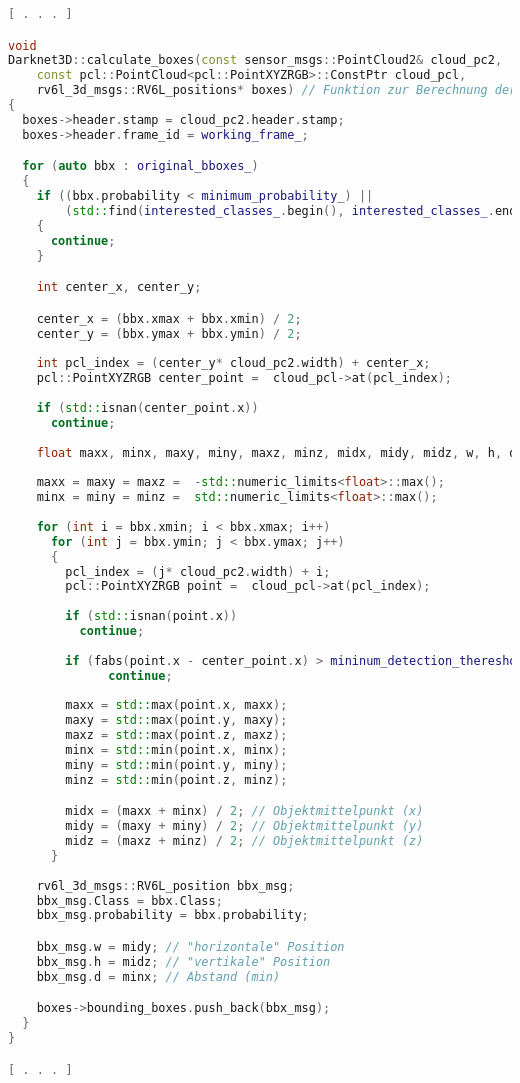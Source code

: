 \begin{lstlisting}[language=c++]
[ . . . ]

void
Darknet3D::calculate_boxes(const sensor_msgs::PointCloud2& cloud_pc2,
    const pcl::PointCloud<pcl::PointXYZRGB>::ConstPtr cloud_pcl,
    rv6l_3d_msgs::RV6L_positions* boxes) // Funktion zur Berechnung der Positionsdaten
{
  boxes->header.stamp = cloud_pc2.header.stamp;
  boxes->header.frame_id = working_frame_;

  for (auto bbx : original_bboxes_)
  {
    if ((bbx.probability < minimum_probability_) ||
        (std::find(interested_classes_.begin(), interested_classes_.end(), bbx.Class) == interested_classes_.end()))
    {
      continue;
    }

    int center_x, center_y;

    center_x = (bbx.xmax + bbx.xmin) / 2;
    center_y = (bbx.ymax + bbx.ymin) / 2;
    
    int pcl_index = (center_y* cloud_pc2.width) + center_x;
    pcl::PointXYZRGB center_point =  cloud_pcl->at(pcl_index);
    
    if (std::isnan(center_point.x))
      continue;
    
    float maxx, minx, maxy, miny, maxz, minz, midx, midy, midz, w, h, d;
    
    maxx = maxy = maxz =  -std::numeric_limits<float>::max();
    minx = miny = minz =  std::numeric_limits<float>::max();
  
    for (int i = bbx.xmin; i < bbx.xmax; i++)
      for (int j = bbx.ymin; j < bbx.ymax; j++)
      {
        pcl_index = (j* cloud_pc2.width) + i;
        pcl::PointXYZRGB point =  cloud_pcl->at(pcl_index);
    
        if (std::isnan(point.x))
          continue;
    
        if (fabs(point.x - center_point.x) > mininum_detection_thereshold_)
              continue;
    
        maxx = std::max(point.x, maxx); 
        maxy = std::max(point.y, maxy);
        maxz = std::max(point.z, maxz);
        minx = std::min(point.x, minx);
        miny = std::min(point.y, miny);
        minz = std::min(point.z, minz);

        midx = (maxx + minx) / 2; // Objektmittelpunkt (x)
        midy = (maxy + miny) / 2; // Objektmittelpunkt (y)
        midz = (maxz + minz) / 2; // Objektmittelpunkt (z)
      }
    
    rv6l_3d_msgs::RV6L_position bbx_msg;
    bbx_msg.Class = bbx.Class;
    bbx_msg.probability = bbx.probability;

    bbx_msg.w = midy; // "horizontale" Position
    bbx_msg.h = midz; // "vertikale" Position
    bbx_msg.d = minx; // Abstand (min)

    boxes->bounding_boxes.push_back(bbx_msg);
  }
}

[ . . . ]
\end{lstlisting}


